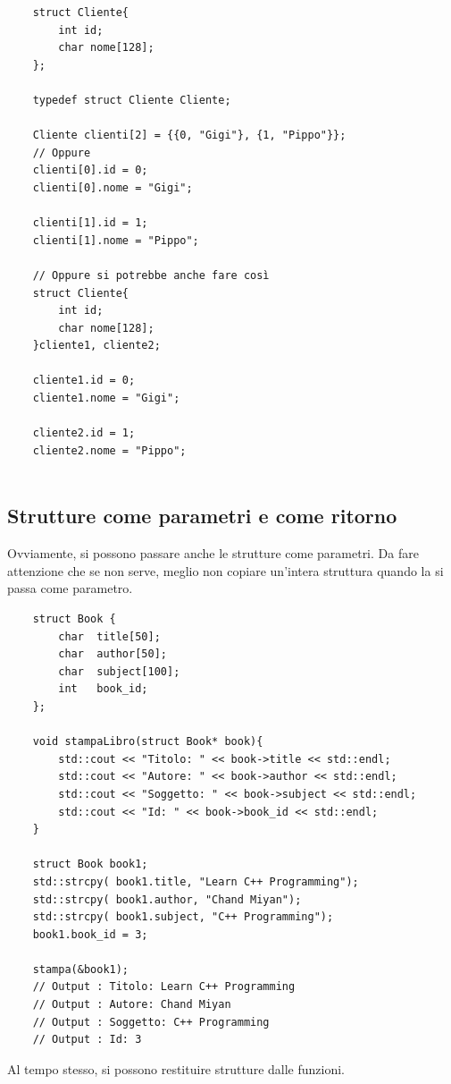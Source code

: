 \begin{lstlisting}
	struct Cliente{
		int id;
		char nome[128];
	};

	typedef struct Cliente Cliente;
	
	Cliente clienti[2] = {{0, "Gigi"}, {1, "Pippo"}};
	// Oppure
	clienti[0].id = 0;
	clienti[0].nome = "Gigi";
	
	clienti[1].id = 1;
	clienti[1].nome = "Pippo";
	
	// Oppure si potrebbe anche fare così
	struct Cliente{
		int id;
		char nome[128];
	}cliente1, cliente2;

	cliente1.id = 0;
	cliente1.nome = "Gigi";
	
	cliente2.id = 1;
	cliente2.nome = "Pippo";
	
\end{lstlisting}

\subsection{Strutture come parametri e come ritorno}

\textsf{\small Ovviamente, si possono passare anche le strutture come parametri. Da fare attenzione che se non serve, meglio non copiare un'intera struttura quando la si passa come parametro.}

\begin{lstlisting}
	struct Book {
		char  title[50];
		char  author[50];
		char  subject[100];
		int   book_id;
	};
	
	void stampaLibro(struct Book* book){
		std::cout << "Titolo: " << book->title << std::endl;
		std::cout << "Autore: " << book->author << std::endl;
		std::cout << "Soggetto: " << book->subject << std::endl;
		std::cout << "Id: " << book->book_id << std::endl;
	}

	struct Book book1;
	std::strcpy( book1.title, "Learn C++ Programming");
	std::strcpy( book1.author, "Chand Miyan"); 
	std::strcpy( book1.subject, "C++ Programming");
	book1.book_id = 3;
	
	stampa(&book1);
	// Output : Titolo: Learn C++ Programming
	// Output : Autore: Chand Miyan
	// Output : Soggetto: C++ Programming
	// Output : Id: 3
\end{lstlisting}

\textsf{\small Al tempo stesso, si possono restituire strutture dalle funzioni.} \\

